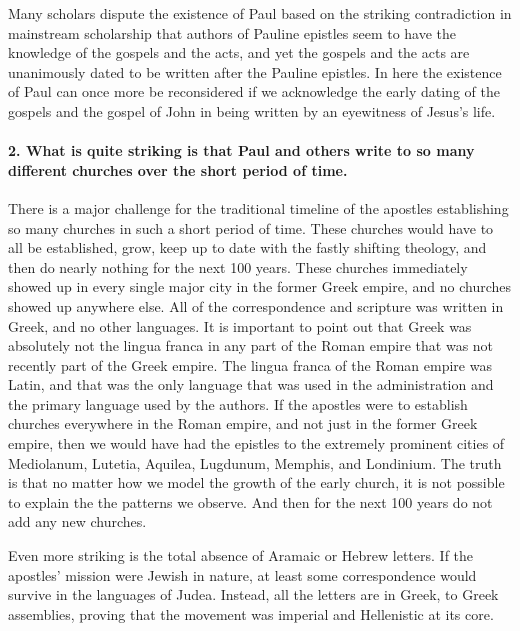 Many scholars dispute the existence of Paul based on the striking contradiction in mainstream scholarship that authors of Pauline epistles seem to have the knowledge of the gospels and the acts, and yet the gospels and the acts are unanimously dated to be written after the Pauline epistles.
In here the existence of Paul can once more be reconsidered if we acknowledge the early dating of the gospels and the gospel of John in being written by an eyewitness of Jesus's life.

\paragraph{2.
What is quite striking is that Paul and others write to so many different churches over the short period of time.}\label{par:what-is-quite-striking-is-that-paul-and-others-write-to-so-many-different-churches-over-the-short-period-of-time.}

There is a major challenge for the traditional timeline of the apostles establishing so many churches in such a short period of time.
These churches would have to all be established, grow, keep up to date with the fastly shifting theology, and then do nearly nothing for the next 100 years.
These churches immediately showed up in every single major city in the former Greek empire, and no churches showed up anywhere else.
All of the correspondence and scripture was written in Greek, and no other languages.
It is important to point out that Greek was absolutely not the lingua franca in any part of the Roman empire that was not recently part of the Greek empire.
The lingua franca of the Roman empire was Latin, and that was the only language that was used in the administration and the primary language used by the authors.
If the apostles were to establish churches everywhere in the Roman empire, and not just in the former Greek empire, then we would have had the epistles to the extremely prominent cities of Mediolanum, Lutetia, Aquilea, Lugdunum, Memphis, and Londinium.
The truth is that no matter how we model the growth of the early church, it is not possible to explain the the patterns we observe.
And then for the next 100 years do not add any new churches.

Even more striking is the total absence of Aramaic or Hebrew letters.
If the apostles’ mission were Jewish in nature, at least some correspondence would survive in the languages of Judea.
Instead, all the letters are in Greek, to Greek assemblies, proving that the movement was imperial and Hellenistic at its core.

